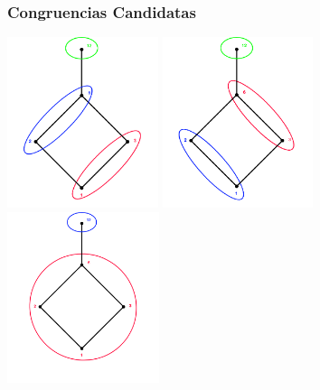 \documentclass{beamer}
\begin{document}

\begin{frame}
\frametitle{Congruencias Candidatas}
\begin{center}
\includegraphics[height=5cm]{congruencia_3}
\includegraphics[height=5cm]{congruencia_4}
\includegraphics[height=5cm]{congruencia_5}
\end{center}
\end{frame}



\end{document}
